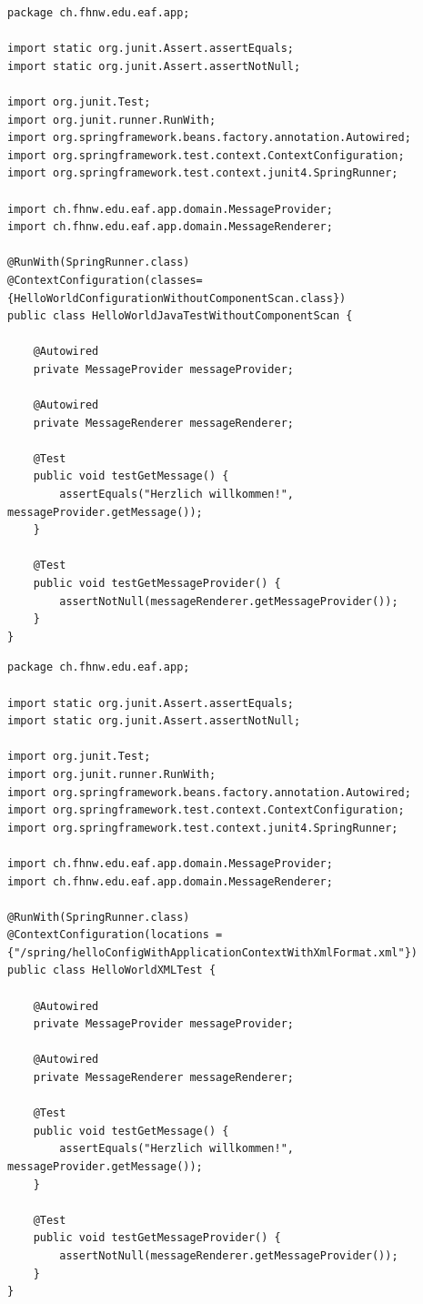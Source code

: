 \documentclass[a4paper,10pt]{scrreprt}
\begin{document}
\begin{lstlisting}[caption=HelloWorldJavaTestWithoutComponentScan.java]
package ch.fhnw.edu.eaf.app;

import static org.junit.Assert.assertEquals;
import static org.junit.Assert.assertNotNull;

import org.junit.Test;
import org.junit.runner.RunWith;
import org.springframework.beans.factory.annotation.Autowired;
import org.springframework.test.context.ContextConfiguration;
import org.springframework.test.context.junit4.SpringRunner;

import ch.fhnw.edu.eaf.app.domain.MessageProvider;
import ch.fhnw.edu.eaf.app.domain.MessageRenderer;

@RunWith(SpringRunner.class)
@ContextConfiguration(classes= {HelloWorldConfigurationWithoutComponentScan.class})
public class HelloWorldJavaTestWithoutComponentScan {
	
	@Autowired
	private MessageProvider messageProvider;
	
	@Autowired
	private MessageRenderer messageRenderer;
	
	@Test
	public void testGetMessage() {
		assertEquals("Herzlich willkommen!", messageProvider.getMessage());
	}

	@Test
	public void testGetMessageProvider() {
		assertNotNull(messageRenderer.getMessageProvider());
	}
}

\end{lstlisting}
\begin{lstlisting}[caption=HelloWorldXMLTest.java]
package ch.fhnw.edu.eaf.app;

import static org.junit.Assert.assertEquals;
import static org.junit.Assert.assertNotNull;

import org.junit.Test;
import org.junit.runner.RunWith;
import org.springframework.beans.factory.annotation.Autowired;
import org.springframework.test.context.ContextConfiguration;
import org.springframework.test.context.junit4.SpringRunner;

import ch.fhnw.edu.eaf.app.domain.MessageProvider;
import ch.fhnw.edu.eaf.app.domain.MessageRenderer;

@RunWith(SpringRunner.class)
@ContextConfiguration(locations = {"/spring/helloConfigWithApplicationContextWithXmlFormat.xml"})
public class HelloWorldXMLTest {
	
	@Autowired
	private MessageProvider messageProvider;
	
	@Autowired
	private MessageRenderer messageRenderer;
	
	@Test
	public void testGetMessage() {
		assertEquals("Herzlich willkommen!", messageProvider.getMessage());
	}

	@Test
	public void testGetMessageProvider() {
		assertNotNull(messageRenderer.getMessageProvider());
	}
}

\end{lstlisting}
\end{document}

